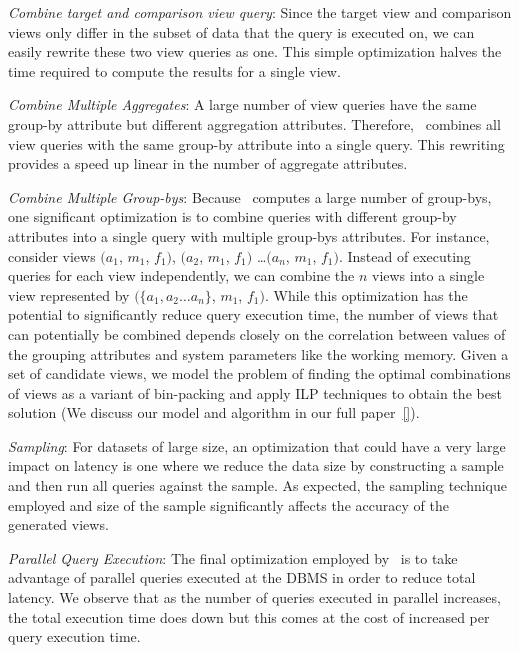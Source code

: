 \begin{denselist}
  \item {\it Combine target and comparison view query}: Since the target view
  and comparison views only differ in the subset of data that the query is
  executed on, we can easily rewrite these two view queries as one.
  This simple optimization halves the time required to compute the results for
  a single view.
  \item {\it Combine Multiple Aggregates}: A large number of view
  queries have the same group-by attribute but different aggregation attributes.
  Therefore, \SeeDB\ combines all view queries with the same group-by attribute
  into a single query. This rewriting provides a speed up linear in the
  number of aggregate attributes.
  \item {\it Combine Multiple Group-bys}: 
  Because \SeeDB\ computes a large number of group-bys, one significant
  optimization is to combine queries with different
  group-by attributes into a single query with multiple group-bys attributes.
  For instance, consider views $(a_1$, $m_1$, $f_1)$, $(a_2$, $m_1$, $f_1)$
  \ldots $(a_n$, $m_1$, $f_1)$. Instead of executing queries for each view
  independently, we can combine the $n$ views into a single view represented by
  $(\{a_1, a_2\ldots a_n\}$, $m_1$, $f_1)$. 
  While this optimization has the potential to significantly reduce query
  execution time, the number of views that can potentially be combined depends
  closely on the correlation between values of the grouping attributes and system parameters like the
  working memory. Given a set of candidate views, we model the problem of
  finding the optimal combinations of views as a variant of bin-packing and
  apply ILP techniques to obtain the best solution (We discuss our model and
  algorithm in our full paper~\ref{}).
  \item {\it Sampling}: For datasets of large size, an optimization that could
  have a very large impact on latency is one where we reduce the data size by
  constructing a sample and then run all queries against the sample. As
  expected, the sampling technique employed 
  and size of the sample significantly affects
  the accuracy of the generated views. 
  \item {\it Parallel Query Execution}: The final optimization employed by
  \SeeDB\ is to take advantage of parallel queries executed at the DBMS in order to reduce total
  latency. We observe that as the number of queries executed in parallel
  increases, the total execution time does down but this comes at the cost of
  increased per query execution time.
\end{denselist}



